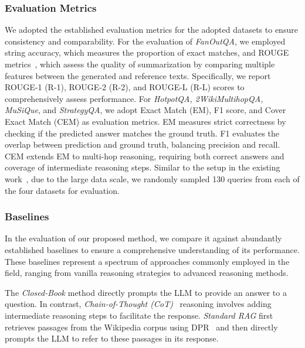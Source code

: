 \subsubsection{Evaluation Metrics}
We adopted the established evaluation metrics for the adopted datasets to ensure consistency and comparability. For the evaluation of \textit{FanOutQA}, we employed string accuracy, which measures the proportion of exact matches, and ROUGE metrics~\cite{lin2004rouge}, which assess the quality of summarization by comparing multiple features between the generated and reference texts. Specifically, we report ROUGE-1 (R-1), ROUGE-2 (R-2), and ROUGE-L (R-L) scores to comprehensively assess performance.
For \textit{HotpotQA, 2WikiMultihopQA, MuSiQue}, and \textit{StrategyQA}, we adopt Exact Match (EM), F1 score, and Cover Exact Match (CEM) as evaluation metrics. EM measures strict correctness by checking if the predicted answer matches the ground truth. F1 evaluates the overlap between prediction and ground truth, balancing precision and recall. CEM extends EM to multi-hop reasoning, requiring both correct answers and coverage of intermediate reasoning steps.
Similar to the setup in the existing work~\cite{jiang2024rag}, due to the large data scale, we randomly sampled 130 queries from each of the four datasets for evaluation.

\subsubsection{Baselines}
In the evaluation of our proposed method, we compare it against abundantly established baselines to ensure a comprehensive understanding of its performance. These baselines represent a spectrum of approaches commonly employed in the field, ranging from vanilla reasoning strategies to advanced reasoning methods.

\quad
The \textit{Closed-Book} method directly prompts the LLM to provide an answer to a question. In contrast, \textit{Chain-of-Thought (CoT)}~\cite{wei2022chain} reasoning involves adding intermediate reasoning steps to facilitate the response. \textit{Standard RAG} first retrieves passages from the Wikipedia corpus using DPR~\cite{dpr2020} and then directly prompts the LLM to refer to these passages in its response. 

